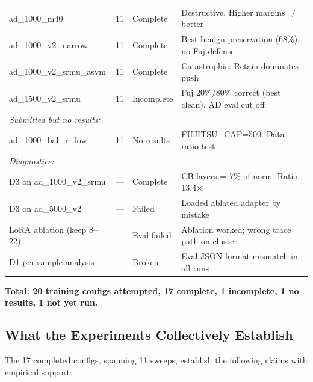 \documentclass[11pt]{article}
\newcommand{\bad}[1]{\textcolor{bad}{#1}}
\begin{document}
\begin{center}
\begin{tabular}{llll}
ad\_1000\_m40 & 11 & Complete & Destructive. Higher margins $\neq$ better \\
ad\_1000\_v2\_narrow & 11 & Complete & Best benign preservation (68\%), no Fuj defense \\
ad\_1000\_v2\_srmu\_asym & 11 & Complete & Catastrophic. Retain dominates push \\
ad\_1500\_v2\_srmu & 11 & \bad{Incomplete} & Fuj 20\%/80\% correct (best clean). AD eval cut off \\
\midrule
\multicolumn{4}{l}{\textit{Submitted but no results:}} \\
ad\_1000\_bal\_r\_low & 11 & \bad{No results} & FUJITSU\_CAP=500. Data ratio test \\
\midrule
\multicolumn{4}{l}{\textit{Diagnostics:}} \\
D3 on ad\_1000\_v2\_srmu & --- & Complete & CB layers = 7\% of norm. Ratio 13.4$\times$ \\
D3 on ad\_5000\_v2 & --- & \bad{Failed} & Loaded ablated adapter by mistake \\
LoRA ablation (keep 8--22) & --- & \bad{Eval failed} & Ablation worked; wrong trace path on cluster \\
D1 per-sample analysis & --- & \bad{Broken} & Eval JSON format mismatch in all runs \\
\bottomrule
\end{tabular}
\end{center}

\textbf{Total: 20 training configs attempted, 17 complete, 1 incomplete, 1 no results, 1 not yet run.}

\subsection{What the Experiments Collectively Establish}

The 17 completed configs, spanning 11 sweeps, establish the following
claims with empirical support:
\end{document}
